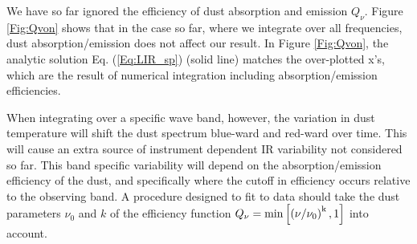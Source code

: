 We have so far ignored the efficiency of dust absorption and emission
$Q_{\nu}$. Figure \ref{Fig:Qvon} shows that in the case so far, where we
integrate over all frequencies, dust absorption/emission does not affect our
result. In Figure \ref{Fig:Qvon}, the analytic solution Eq. (\ref{Eq:LIR_sp})
(solid line) matches the over-plotted x's, which are the result of
numerical integration including absorption/emission efficiencies.



When integrating over a specific wave band, however, the variation in dust
temperature will shift the dust spectrum blue-ward and red-ward over time.
This will cause an extra source of instrument dependent IR variability not
considered so far. This band specific variability will depend on the
absorption/emission efficiency of the dust, and specifically where the cutoff
in efficiency occurs relative to the observing band. A procedure designed to
fit to data should take the dust parameters $\nu_0$ and $k$ of the efficiency
function $Q_{\nu} = \rm{min}\left[ \left( \nu/ \nu_0 \right)^{k}, 1\right]$
into account.








